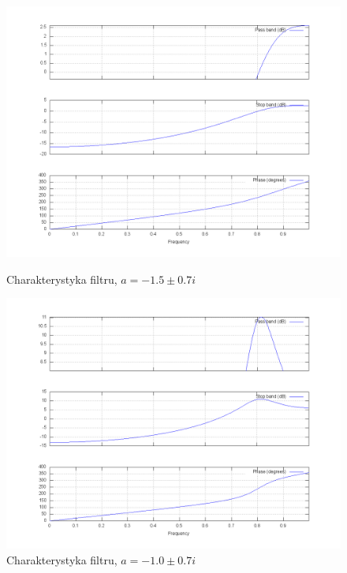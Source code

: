 \documentclass[wide,a4paper,titlepage,12pt]{mwart}
\begin{document}
  \begin{figure}[htbp]
    \begin{center}
      \includegraphics[scale=.3]{out/fig37.png}
      \caption{\label{fig37} Charakterystyka filtru, $a=-1.5\pm0.7i$}
      \includegraphics[scale=.3]{out/fig38.png}
      \caption{\label{fig38} Charakterystyka filtru, $a=-1.0\pm0.7i$}
  
    \end{center}
  \end{figure}
\end{document}
